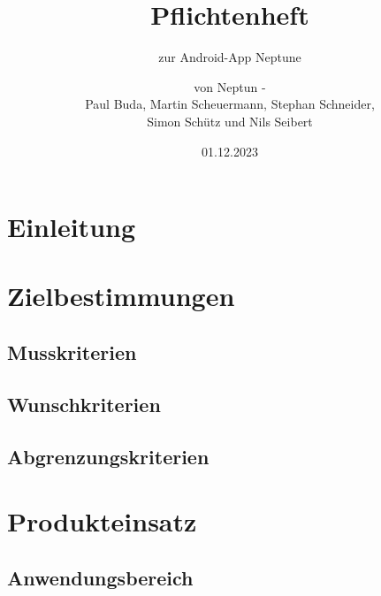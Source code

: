 \documentclass[oneside, ngerman]{sdqtechreport}
\author{von Neptun - \\
Paul Buda, Martin Scheuermann, Stephan Schneider, \\
Simon Schütz und Nils Seibert}
\title{Pflichtenheft}
\subtitle{zur Android-App Neptune}
\date{01.12.2023}
\begin{document}
\setpdf

\maketitle

\tableofcontents

\cleardoublepage


\chapter{Einleitung}
\label{chap:Einleitung}



\chapter{Zielbestimmungen}
\label{chap:Zielbestimmungen}

\section{Musskriterien}
\label{sec:Zielbestimmungen:Musskriterien}

\section{Wunschkriterien}
\label{sec:Zielbestimmungen:Wunschkriterien}

\section{Abgrenzungskriterien}
\label{sec:Zielbestimmungen:Abgrenzungskriterien}



\chapter{Produkteinsatz}
\label{chap:Produkteinsatz}

\section{Anwendungsbereich}
\label{sec:Produkteinsatz:Anwendungsbereich}
\end{document}
